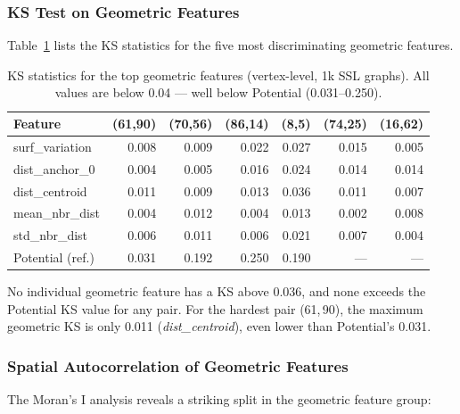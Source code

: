 \subsubsection{KS Test on Geometric Features}

Table~\ref{tab:ks_geom} lists the KS statistics for the five most
discriminating geometric features.

\begin{table}[ht]
  \centering
  \caption{KS statistics for the top geometric features (vertex-level, 1k
           SSL graphs).
           All values are below 0.04 --- well below Potential (0.031--0.250).}
  \label{tab:ks_geom}
  \begin{tabular}{lrrrrrr}
    \toprule
    \textbf{Feature}
      & \textbf{(61,90)} & \textbf{(70,56)} & \textbf{(86,14)}
      & \textbf{(8,5)}   & \textbf{(74,25)} & \textbf{(16,62)} \\
    \midrule
    surf\_variation   & 0.008 & 0.009 & 0.022 & 0.027 & 0.015 & 0.005 \\
    dist\_anchor\_0   & 0.004 & 0.005 & 0.016 & 0.024 & 0.014 & 0.014 \\
    dist\_centroid    & 0.011 & 0.009 & 0.013 & 0.036 & 0.011 & 0.007 \\
    mean\_nbr\_dist   & 0.004 & 0.012 & 0.004 & 0.013 & 0.002 & 0.008 \\
    std\_nbr\_dist    & 0.006 & 0.011 & 0.006 & 0.021 & 0.007 & 0.004 \\
    \midrule
    Potential (ref.)  & 0.031 & 0.192 & 0.250 & 0.190 & ---   & ---   \\
    \bottomrule
  \end{tabular}
\end{table}

No individual geometric feature has a KS above 0.036, and none exceeds the
Potential KS value for any pair.
For the hardest pair (61,\,90), the maximum geometric KS is only 0.011
(\textit{dist\_centroid}), even lower than Potential's 0.031.

\subsubsection{Spatial Autocorrelation of Geometric Features}

The Moran's I analysis reveals a striking split in the geometric feature
group:

